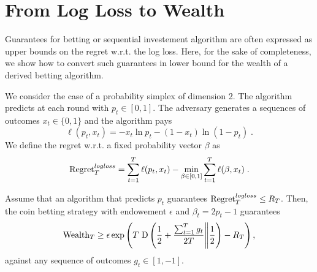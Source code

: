 \section{From Log Loss to Wealth}
\label{section:logloss-to-wealth}

Guarantees for betting or sequential investement algorithm are often expressed as upper bounds on the regret w.r.t. the log loss. 
Here, for the sake of completeness, we show how to convert such guarantees in lower bound for the wealth of a derived betting algorithm.

We consider the case of a probability simplex of dimension 2.
The algorithm predicts at each round with $p_t \in [0,1]$. The adversary generates a sequences of outcomes $x_t \in \{0,1\}$ and the algorithm pays
\[
\ell(p_t,x_t)=-x_t \ln p_{t} -(1-x_t) \ln (1-p_t) \; .
\]
We define the regret w.r.t. a fixed probability vector $\beta$ as
\[
\operatorname{Regret}^{logloss}_T = \sum_{t=1}^T \ell(p_t,x_t) - \min_{\beta \in [0,1]} \sum_{t=1}^T \ell(\beta,x_t) \; .  
\]

\begin{lemma}
Assume that an algorithm that predicts $p_t$ guarantees $\operatorname{Regret}^{logloss}_T \leq R_T$.
Then, the coin betting strategy with endowement $\epsilon$ and $\beta_t = 2 p_{t}-1$ guarantees
\[
\operatorname{Wealth}_T \geq \epsilon \exp\left(T \,\operatorname{D}\left({\frac{1}{2} + \frac{\sum_{t=1}^T g_t}{2 T}}\middle\|{\frac{1}{2}}\right) - R_T \right),
\]
against any sequence of outcomes $g_t \in [1,-1]$.
\end{lemma}


